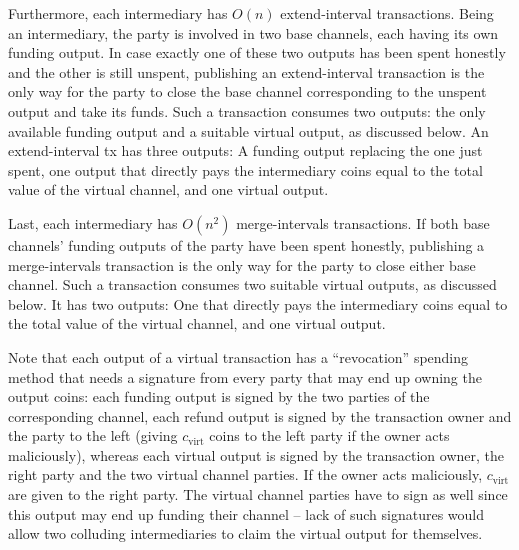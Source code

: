   Furthermore, each intermediary has $O(n)$ extend-interval transactions.
  Being an intermediary, the party is involved in two base channels, each having
  its own funding output. In case exactly one of these two outputs has been spent
  honestly and the other is still unspent,
  publishing an extend-interval transaction is the only way for the party to
  close the base channel corresponding to the unspent output and take its funds.
  Such a transaction consumes two outputs: the only
  available funding output and a suitable virtual output, as discussed below. An
  extend-interval tx has three outputs: A funding output replacing the one just
  spent, one output that directly pays the intermediary coins equal to the total
  value of the virtual channel, and one virtual output.

  Last, each intermediary has $O(n^2)$ merge-intervals transactions. If both
  base channels' funding outputs of the party have been spent honestly, publishing a merge-intervals
  transaction is the only way for the party to close either base channel. Such a
  transaction consumes two suitable virtual outputs, as discussed below. It has
  two outputs: One that directly pays the intermediary coins equal to the total
  value of the virtual channel, and one virtual output.

  Note that each output of a virtual transaction has a ``revocation'' spending
  method that needs a signature from every party that may end up owning the
  output coins: each funding output is signed by the two parties of the
  corresponding channel, each refund output is signed by the transaction owner
  and the party to the left (giving $c_{\mathrm{virt}}$ coins to the left party
  if the owner acts maliciously), whereas each virtual output is signed by the
  transaction owner, the right party and the two virtual channel parties. If the
  owner acts maliciously, $c_{\mathrm{virt}}$ are given to the right party. The
  virtual channel parties have to sign as well since this output may end up
  funding their channel -- lack of such signatures would allow two colluding
  intermediaries to claim the virtual output for themselves.

